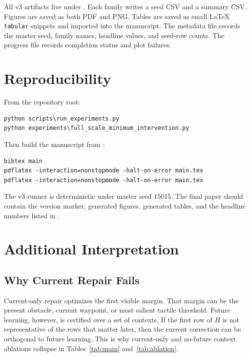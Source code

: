\documentclass{article}
\begin{document}
All v3 artifacts live under . Each family writes a
seed CSV and a summary CSV. Figures are saved as both PDF and PNG. Tables are
saved as small LaTeX \texttt{tabular} snippets and imported into the manuscript.
The metadata file records the master seed, family names, headline values, and
seed-row counts. The progress file records completion status and plot failures.

\begin{table}[t]
\centering
\caption{Claim-to-evidence map generated by the runner.}
\resizebox{\linewidth}{!}{}
\label{tab:claims}
\end{table}

\section{Reproducibility}

From the repository root:
\begin{verbatim}
python scripts\run_experiments.py
python experiments\full_scale_minimum_intervention.py
\end{verbatim}
Then build the manuscript from :
\begin{verbatim}
bibtex main
pdflatex -interaction=nonstopmode -halt-on-error main.tex
pdflatex -interaction=nonstopmode -halt-on-error main.tex
\end{verbatim}
The v3 runner is deterministic under master seed 15015. The final paper should
contain the version marker, generated figures, generated tables, and the
headline numbers listed in .

\section{Additional Interpretation}

\subsection{Why Current Repair Fails}

Current-only repair optimizes the first visible margin. That margin can be the
present obstacle, current waypoint, or most salient tactile threshold. Future
learning, however, is certified over a set of contexts. If the first row of $H$
is not representative of the rows that matter later, then the current correction
can be orthogonal to future learning. This is why current-only and no-future
context ablations collapse in Tables~\ref{tab:main} and~\ref{tab:ablation}.
\end{document}
